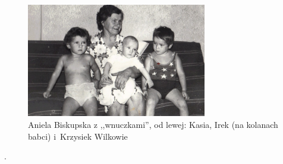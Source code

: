 \begin{figure}[!h]
\begin{center}
\includegraphics[width=0.7\textwidth]{zdjecia/aniela_biskupska_z_wnuczkami.jpg}
\caption[Aniela Biskupska z wnuczkami]{Aniela Biskupska z ,,wnuczkami'', od lewej: Kasia, Irek (na kolanach babci) i~Krzysiek Wilkowie}
\label{rys:aniela_biskupska_z_wnuczkami}
\end{center}
\end{figure}


. 
